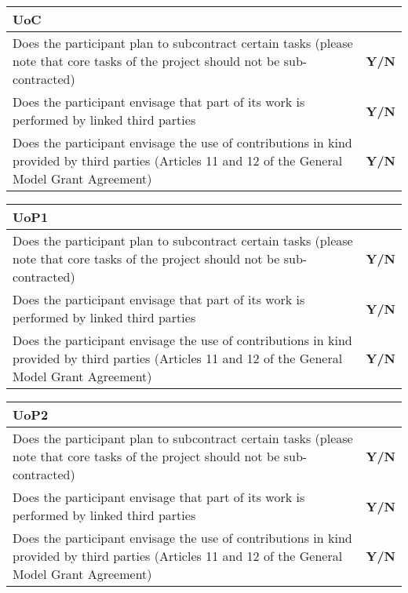 \begin{tabular}{|p{}|p{}|}
  \hline  
  \multicolumn{2}{|l|}{\cellcolor[gray]{0.8}\textbf{UoC}}\\
  \hline
  Does the participant plan to subcontract certain tasks (please note that core tasks of the project should not be sub-contracted) &
  \textbf{Y/N} \\
  \hline
Does the participant envisage that part of its work is performed by linked
third parties &
  \textbf{Y/N} \\
  \hline
  Does the participant envisage the use of contributions in kind provided by
third parties (Articles 11 and 12 of the General Model Grant Agreement) &
  \textbf{Y/N}\\
  \hline
\end{tabular}

\begin{tabular}{|p{}|p{}|}
  \hline  
  \multicolumn{2}{|l|}{\cellcolor[gray]{0.8}\textbf{UoP1}}\\
  \hline
  Does the participant plan to subcontract certain tasks (please note that core tasks of the project should not be sub-contracted) &
  \textbf{Y/N} \\
  \hline
Does the participant envisage that part of its work is performed by linked
third parties &
  \textbf{Y/N} \\
  \hline
  Does the participant envisage the use of contributions in kind provided by
third parties (Articles 11 and 12 of the General Model Grant Agreement) &
  \textbf{Y/N}\\
  \hline
\end{tabular}


\begin{tabular}{|p{}|p{}|}
  \hline  
  \multicolumn{2}{|l|}{\cellcolor[gray]{0.8}\textbf{UoP2}}\\
  \hline
  Does the participant plan to subcontract certain tasks (please note that core tasks of the project should not be sub-contracted) &
  \textbf{Y/N} \\
  \hline
Does the participant envisage that part of its work is performed by linked
third parties &
  \textbf{Y/N} \\
  \hline
  Does the participant envisage the use of contributions in kind provided by
third parties (Articles 11 and 12 of the General Model Grant Agreement) &
  \textbf{Y/N}\\
  \hline
\end{tabular}

